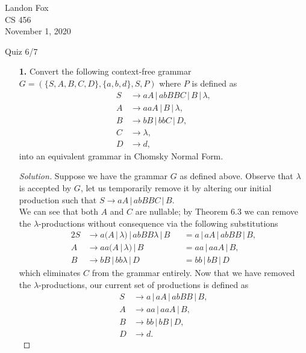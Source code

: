 \documentclass[ 12pt ]{article}
\begin{document}
\noindent Landon Fox \\
\noindent CS 456 \\
\noindent November 1, 2020

\begin{center}
	\Large Quiz 6/7
\end{center}

\begin{enumerate}
	\item[\textbf{1.}] Convert the following context-free grammar $G = (\{ S, A, B, C, D \}, \{ a, b, d \}, S, P)$ where $P$ is defined as
		\begin{align*}
			S &\to aA\, |\, abBBC\, |\, B\, |\, \lambda, \\
			A &\to aaA\, |\, B\, |\, \lambda, \\
			B &\to bB\, |\, bbC\, |\, D, \\
			C &\to \lambda, \\
			D &\to d,
		\end{align*}
		into an equivalent grammar in Chomsky Normal Form.

		\begin{proof}[Solution]
			Suppose we have the grammar $G$ as defined above. Observe that $\lambda$ is accepted by $G$, let us temporarily remove it by altering our initial production such that
			$S \to aA\, |\, abBBC\, |\, B$. \\

			We can see that both $A$ and $C$ are nullable; by Theorem 6.3 we can remove the $\lambda$-productions without consequence via the following substitutions
			\begin{alignat*}{2}
				S &\to a(A\, |\, \lambda)\, |\, abBB \lambda\, |\, B &&= a\, |\, aA\, |\, abBB\, |\, B, \\
				A &\to aa(A\, |\, \lambda)\, |\, B &&= aa\, |\, aaA\, |\, B, \\
				B &\to bB\, |\, bb \lambda\, |\, D &&= bb\, |\, bB\, |\, D
			\end{alignat*}
			which eliminates $C$ from the grammar entirely. Now that we have removed the $\lambda$-productions, our current set of productions is defined as
			\begin{align*}
				S &\to a\, |\, aA\, |\, abBB\, |\, B, \\
				A &\to aa\, |\, aaA\, |\, B, \\
				B &\to bb\, |\, bB\, |\, D, \\
				D &\to d.
			\end{align*}


\end{proof}
\end{enumerate}
\end{document}
